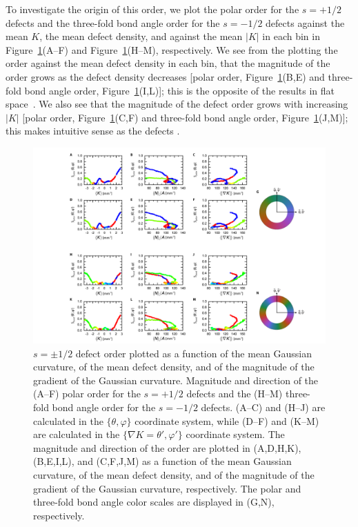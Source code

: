 To investigate the origin of this order, we plot the polar order for the $s = +1/2$ defects and the three-fold bond angle order for the $s = -1/2$ defects against the mean $K$, the mean defect density, and against the mean $|K|$ in each bin in Figure~\ref{f:7-Orient_PolarHex}(A--F) and Figure~\ref{f:7-Orient_PolarHex}(H--M), respectively.
We see from the plotting the order against the mean defect density in each bin, that the magnitude of the order grows as the defect density decreases [polar order, Figure~\ref{f:7-Orient_PolarHex}(B,E) and three-fold bond angle order, Figure~\ref{f:7-Orient_PolarHex}(I,L)]; this is the opposite of the results in flat space~\cite{RN27}.
We also see that the magnitude of the defect order grows with increasing $|K|$ [polar order, Figure~\ref{f:7-Orient_PolarHex}(C,F) and three-fold bond angle order, Figure~\ref{f:7-Orient_PolarHex}(J,M)]; this makes intuitive sense as the defects .
\begin{figure}
  \centering
  \includegraphics[width=\textwidth]{figures/C7/Ch7-Figs_Orient_PolarHex.png}
  \caption{$s = \pm 1/2$ defect order plotted as a function of the mean Gaussian curvature, of the mean defect density, and of the magnitude of the gradient of the Gaussian curvature.
  Magnitude and direction of the (A--F) polar order for the $s = +1/2$ defects and the (H--M) three-fold bond angle order for the $s = -1/2$ defects.
  (A--C) and (H--J) are calculated in the $\{\theta,\varphi \}$ coordinate system, while (D--F) and (K--M) are calculated in the $\{ \nabla K = \theta',\varphi' \}$ coordinate system.
  The magnitude and direction of the order are plotted in (A,D,H,K), (B,E,I,L), and (C,F,J,M) as a function of the mean Gaussian curvature, of the mean defect density, and of the magnitude of the gradient of the Gaussian curvature, respectively.
  The polar and three-fold bond angle color scales are displayed in (G,N), respectively.
  }\label{f:7-Orient_PolarHex}
\end{figure}


